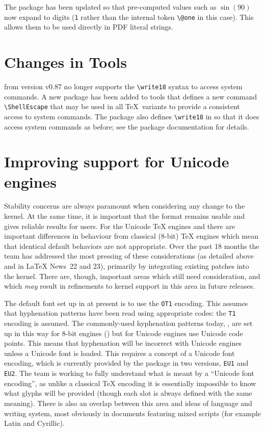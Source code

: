 \documentclass{ltnews}
\begin{document}
The  package has been updated so that pre-computed values
such as $\sin(90)$ now expand to digits (\texttt{1} rather than the
internal token \verb|\@one| in this case). This allows them to be used
directly in PDF literal strings. 

\section{Changes in Tools}

 from version v0.87 no longer supports the
\verb|\write18| syntax to access system commands. A new package
 has been added to \textsf{tools} that defines a new
command \verb|\ShellEscape| that may be used in all \TeX\ variants to
provide a consistent access to system commands. The package also
defines \verb|\write18| in   so that it does access
system commands as before; see the package documentation for details.

\section{Improving support for Unicode engines}

Stability concerns are always paramount when considering any change to
the \LaTeXe{} kernel. At the same time, it is important that the format
remains usable and gives reliable results for users. For the Unicode
\TeX{} engines  and  there are important
differences in behaviour from classical ($8$-bit) \TeX{} engines which
mean that identical default behaviors are not appropriate. Over the
past 18 months the team has addressed the most pressing of these
considerations (as detailed above and in \LaTeX{} News~22 and 23),
primarily by integrating existing patches into the kernel. There are,
though, important areas which still need consideration, and which
\emph{may} result in refinements to kernel support in this area in
future releases.

The default font set up in \LaTeXe{} at present is to use the \texttt{OT1}
encoding. This assumes that hyphenation patterns have been read using
appropriate codes: the \texttt{T1} encoding is assumed. The commonly-used
hyphenation patterns today, , are set up in this
way for $8$-bit engines () but for Unicode engines use
Unicode code points. This means that hyphenation will be incorrect
with Unicode engines unless a Unicode font is loaded. This requires
a concept of a Unicode font encoding, which is currently provided by
the  package in two versions, \texttt{EU1} and
\texttt{EU2}. The team is working to fully understand what is meant
by a ``Unicode font encoding'', as unlike a classical \TeX{} encoding
it is essentially impossible to know what glyphs will be provided
(though each slot is always defined with the same meaning).  There
is also an overlap between this area and ideas of language and writing
system, most obviously in documents featuring mixed scripts (for example
Latin and Cyrillic).
\end{document}
